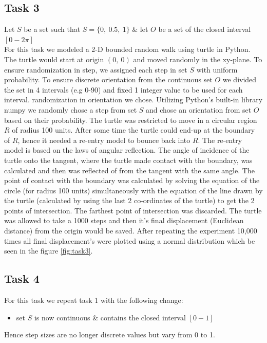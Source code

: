 \documentclass[answers]{exam}
\begin{document}
\subsection {Task 3}
\begin{solution}
    \newline
    Let $S$ be a set such that $S = \{0,\ 0.5,\ 1\}$ \& let $O$ be a set of the closed interval $[0-2\pi]$\\
    For this task we modeled a 2-D bounded random walk using turtle in Python. The turtle would start at origin $(0,\ 0)$ and moved randomly in the xy-plane. To ensure randomization in step, we assigned each step in set $S$ with uniform probability. To ensure discrete orientation from the continuous set $O$ we divided the set in 4 intervals (e.g 0-90) and fixed 1 integer value to be used for each interval. randomization in orientation we chose. Utilizing Python's built-in library numpy we randomly chose a step from set $S$ and chose an orientation from set $O$ based on their probability. The turtle was restricted to move in a circular region $R$ of radius 100 units. After some time the turtle could end-up at the boundary of $R$, hence it needed a re-entry model to bounce back into $R$. The re-entry model is based on the laws of angular reflection. The angle of incidence of the turtle onto the tangent, where the turtle made contact with the boundary, was calculated and then was reflected of from the tangent with the same angle. The point of contact with the boundary was calculated by solving the equation of the circle (for radius 100 units) simultaneously with the equation of the line drawn by the turtle (calculated by using the last 2 co-ordinates of the turtle) to get the 2 points of intersection. The farthest point of intersection was discarded.
    The turtle was allowed to take a 1000 steps and then it's final displacement (Euclidean distance) from the origin would be saved. After repeating the experiment 10,000 times all final displacement's were plotted using a normal distribution which be seen in the figure \ref{fig:task3}.
    
\end{solution}

\subsection {Task 4}
\begin{solution}
    For this task we repeat task 1 with the following change:
    \begin{itemize}
        \item set $S$ is now continuous \& contains the closed interval $[0-1]$
    \end{itemize}
    Hence step sizes are no longer discrete values but vary from 0 to 1. 
\end{solution}
\end{document}
